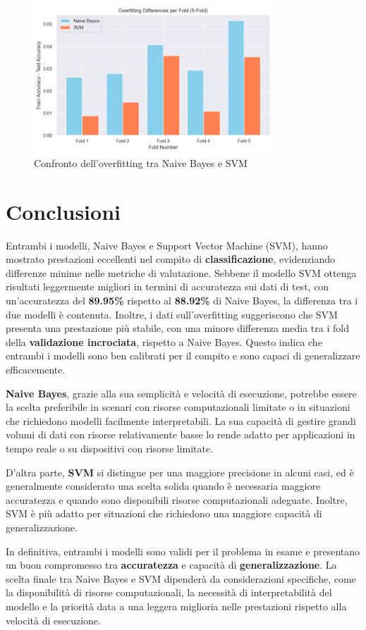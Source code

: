 \begin{figure}[H]
    \centering
    \includegraphics[width=0.8\textwidth]{images/overfitting_differences.png}
    \caption{Confronto dell'overfitting tra Naive Bayes e SVM}
    \label{fig:overfitting_differences}
\end{figure}

\section{Conclusioni}

Entrambi i modelli, Naive Bayes e Support Vector Machine (SVM), hanno mostrato prestazioni eccellenti nel compito di \textbf{classificazione}, evidenziando differenze minime nelle metriche di valutazione. Sebbene il modello SVM ottenga risultati leggermente migliori in termini di accuratezza sui dati di test, con un’accuratezza del \textbf{89.95\%} rispetto al \textbf{88.92\%} di Naive Bayes, la differenza tra i due modelli è contenuta. Inoltre, i dati sull'overfitting suggeriscono che SVM presenta una prestazione più stabile, con una minore differenza media tra i fold della \textbf{validazione incrociata}, rispetto a Naive Bayes. Questo indica che entrambi i modelli sono ben calibrati per il compito e sono capaci di generalizzare efficacemente.

\textbf{Naive Bayes}, grazie alla sua semplicità e velocità di esecuzione, potrebbe essere la scelta preferibile in scenari con risorse computazionali limitate o in situazioni che richiedono modelli facilmente interpretabili. La sua capacità di gestire grandi volumi di dati con risorse relativamente basse lo rende adatto per applicazioni in tempo reale o su dispositivi con risorse limitate.

D’altra parte, \textbf{SVM} si distingue per una maggiore precisione in alcuni casi, ed è generalmente considerato una scelta solida quando è necessaria maggiore accuratezza e quando sono disponibili risorse computazionali adeguate. Inoltre, SVM è più adatto per situazioni che richiedono una maggiore capacità di generalizzazione.

In definitiva, entrambi i modelli sono validi per il problema in esame e presentano un buon compromesso tra \textbf{accuratezza} e capacità di \textbf{generalizzazione}. La scelta finale tra Naive Bayes e SVM dipenderà da considerazioni specifiche, come la disponibilità di risorse computazionali, la necessità di interpretabilità del modello e la priorità data a una leggera miglioria nelle prestazioni rispetto alla velocità di esecuzione. 
